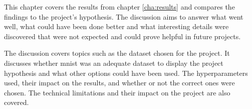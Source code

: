 This chapter covers the results from chapter \autoref{cha:results} and compares the findings to the project's hypothesis. The discussion aims to answer what went well, what could have been done better and what interesting details were discovered that were not expected and could prove helpful in future projects.

The discussion covers topics such as the dataset chosen for the project. It discusses whether \gls{mnist} was an adequate dataset to display the project hypothesis and what other options could have been used. The hyperparameters used, their impact on the results, and whether or not the correct ones were chosen. The technical limitations and their impact on the project are also covered.






